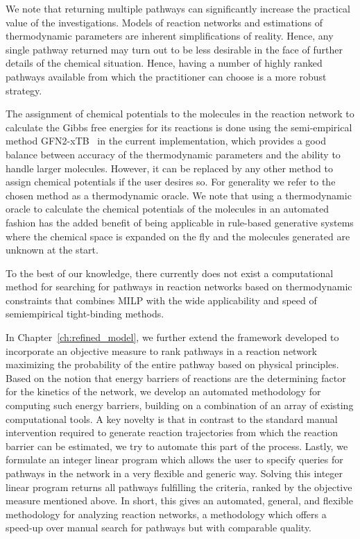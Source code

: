We note that returning multiple pathways can significantly increase the practical value of the investigations.
Models of reaction networks and estimations of thermodynamic parameters are inherent simplifications of reality.
Hence, any single pathway returned may turn out to be less desirable in the face of further details of the chemical situation.
Hence, having a number of highly ranked pathways available from which the practitioner can choose is a more robust strategy.

The assignment of chemical potentials to the molecules in the reaction network to calculate the Gibbs free energies for its reactions is done using the semi-empirical method GFN2-xTB~\cite{grimme_xtb} in the current implementation, which provides a good balance between accuracy of the thermodynamic parameters and the ability to handle larger molecules.
However, it can be replaced by any other method to assign chemical potentials if the user desires so.
For generality we refer to the chosen method as a thermodynamic oracle.
We note that using a thermodynamic oracle to calculate the chemical potentials of the molecules in an automated fashion has the added benefit of being applicable in rule-based generative systems where the chemical space is expanded on the fly and the molecules generated are unknown at the start.

To the best of our knowledge, there currently does not exist a computational method for searching for pathways in reaction networks based on thermodynamic constraints that combines MILP with the wide applicability and speed of semiempirical tight-binding methods.

In Chapter~\ref{ch:refined_model}, we further extend the framework developed to incorporate an objective measure to rank pathways in a reaction network maximizing the probability of the entire pathway based on physical principles. 
Based on the notion that energy barriers of reactions are the determining factor for the kinetics of the network, we develop an automated methodology for computing such energy barriers, building on a combination of an array of existing computational tools. A key novelty is that in contrast to the standard manual intervention required to generate reaction trajectories from which the reaction barrier can be estimated, we try to automate this part of the process.
Lastly, we formulate an integer linear program which allows the user to specify queries for pathways in the network in a very flexible and generic way. Solving this integer linear program returns all pathways fulfilling the criteria, ranked by the objective measure mentioned above.
In short, this gives an automated, general, and flexible methodology for analyzing reaction networks, a methodology which offers a speed-up over manual search for pathways but with comparable quality.


